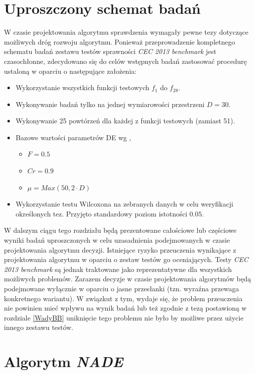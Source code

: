 \documentclass[12pt,a4paper]{report}
\begin{document}
{{{{\section{Uproszczony schemat badań}
\par{
W czasie projektowania algorytmu sprawdzenia wymagały pewne tezy dotyczące możliwych dróg rozwoju algorytmu. Ponieważ przeprowadzenie kompletnego schematu badań zestawu testów sprawności \emph{CEC 2013 benchmark} jest czasochłonne, zdecydowano się do celów wstępnych badań zastosować procedurę ustaloną w oparciu o następujące założenia:
\begin{itemize}
\item Wykorzystanie wszystkich funkcji testowych $f_1$ do $f_{28}$.
\item Wykonywanie badań tylko na jednej wymiarowości przestrzeni $D = 30$.
\item Wykonywanie 25 powtórzeń dla każdej z funkcji testowych (zamiast 51).
\item Bazowe wartości parametrów DE wg \cite{CEC2013DEbasic},
\begin{itemize}
\item $F = 0.5$
\item $Cr = 0.9$
\item $\mu = Max(50, 2 \cdot D)$
\end{itemize}
\item Wykorzystanie testu Wilcoxona na zebranych danych w celu weryfikacji określonych tez. Przyjęto standardowy poziom istotności $0.05$.
\end{itemize}
}
\par{
W dalszym ciągu tego rozdziału będą prezentowane całościowe lub częściowe wyniki badań uproszczonych w celu uzasadnienia podejmowanych w czasie projektowania algorytmu decyzji. Istniejące ryzyko przeuczenia wynikające z projektowania algorytmu w oparciu o zestaw testów go oceniających. Testy \emph{CEC 2013 benchmark} są jednak traktowane jako reprezentatywne dla wszystkich możliwych problemów. Zarazem decyzje w czasie projektowania algorytmów będą podejmowane wyłącznie w oparciu o jasne przesłanki (tzn. wyraźna przewaga konkretnego wariantu). W związkut z tym, wydaje się, że problem przeuczenia nie powinien mieć wpływu na wynik badań lub też zgodnie z tezą postawioną w rozdziale \ref{WadyBB} uniknięcie tego problemu nie było by możliwe przez użycie innego zestawu testów.
}
\section{Algorytm \emph{NADE}}
}}}}
\end{document}
